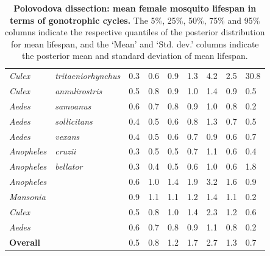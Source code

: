 \documentclass[12pt]{article}
\begin{document}
\begin{table}[htbp]
\begin{tabular}{l|l|l|l|l|l|l|l|l}
		\textit{Culex} & \textit{tritaeniorhynchus} & 0.3 & 0.6 & 0.9 & 1.3 & 4.2 & 2.5 & 30.8 \\
		\textit{Culex} & \textit{annulirostris} & 0.5 & 0.8 & 0.9 & 1.0 & 1.4 & 0.9 & 0.5 \\
		\textit{Aedes} & \textit{samoanus} & 0.6 & 0.7 & 0.8 & 0.9 & 1.0 & 0.8 & 0.2 \\
		\textit{Aedes} & \textit{sollicitans} & 0.4 & 0.5 & 0.6 & 0.8 & 1.3 & 0.7 & 0.5 \\
		\textit{Aedes} & \textit{vexans} & 0.4 & 0.5 & 0.6 & 0.7 & 0.9 & 0.6 & 0.7 \\
		\textit{Anopheles} & \textit{cruzii} & 0.3 & 0.5 & 0.5 & 0.7 & 1.1 & 0.6 & 0.4 \\
		\textit{Anopheles} & \textit{bellator} & 0.3 & 0.4 & 0.5 & 0.6 & 1.0 & 0.6 & 1.8 \\
		\hline
		\textit{Anopheles} & \textit{} & 0.6 & 1.0 & 1.4 & 1.9 & 3.2 & 1.6 & 0.9 \\
		\textit{Mansonia} & \textit{} & 0.9 & 1.1 & 1.1 & 1.2 & 1.4 & 1.1 & 0.2 \\
		\textit{Culex} & \textit{} & 0.5 & 0.8 & 1.0 & 1.4 & 2.3 & 1.2 & 0.6 \\
		\textit{Aedes} & \textit{} & 0.6 & 0.7 & 0.8 & 0.9 & 1.1 & 0.8 & 0.2 \\
		\hline
		\textbf{Overall} & \textit{} & 0.5 & 0.8 & 1.2 & 1.7 & 2.7 & 1.3 & 0.7 \\
	\end{tabular}
	\caption{\textbf{Polovodova dissection: mean female mosquito lifespan in terms of gonotrophic cycles.} The 5\%, 25\%, 50\%, 75\% and 95\% columns indicate the respective quantiles of the posterior distribution for mean lifespan, and the `Mean' and `Std. dev.' columns indicate the posterior mean and standard deviation of mean lifespan.}
	\label{tab:dissection_estimated_lifespans}%
\end{table}
\end{document}
